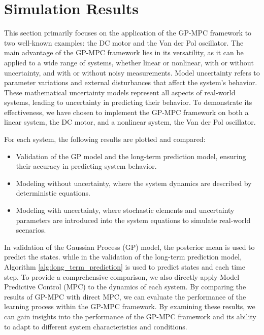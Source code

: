 \section{Simulation Results}	\label{sec:results_rts_en}

This section primarily focuses on the application of the GP-MPC framework to two well-known examples: the DC motor and the Van der Pol oscillator. The main advantage of the GP-MPC framework lies in its versatility, as it can be applied to a wide range of systems, whether linear or nonlinear, with or without uncertainty, and with or without noisy measurements. Model uncertainty refers to parameter variations and external disturbances that affect the system's behavior. These mathematical uncertainty models represent all aspects of real-world systems, leading to uncertainty in predicting their behavior. To demonstrate its effectiveness, we have chosen to implement the GP-MPC framework on both a linear system, the DC motor, and a nonlinear system, the Van der Pol oscillator.

For each system, the following results are plotted and compared:

\begin{itemize}
    \item Validation of the GP model and the long-term prediction model, ensuring their accuracy in predicting system behavior.
    \item Modeling without uncertainty, where the system dynamics are described by deterministic equations.
    \item Modeling with uncertainty, where stochastic elements and uncertainty parameters are introduced into the system equations to simulate real-world scenarios.
\end{itemize}
In validation of the Gaussian Process (GP) model, the posterior mean is used to predict the states. while in the validation of the long-term prediction model, Algorithm \ref{alg:long_term_prediction} is used to predict states and each time step. To provide a comprehensive comparison, we also directly apply Model Predictive Control (MPC) to the dynamics of each system. By comparing the results of GP-MPC with direct MPC, we can evaluate the performance of the learning process within the GP-MPC framework. By examining these results, we can gain insights into the performance of the GP-MPC framework and its ability to adapt to different system characteristics and conditions.


